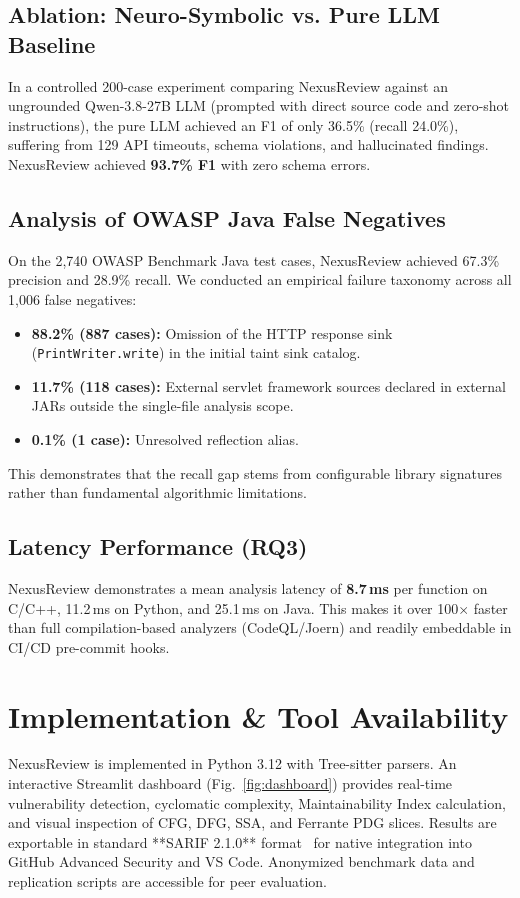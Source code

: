 \documentclass[10pt,conference]{IEEEtran}
\begin{document}
\subsection{Ablation: Neuro-Symbolic vs. Pure LLM Baseline}
In a controlled 200-case experiment comparing NexusReview against an ungrounded Qwen-3.8-27B LLM (prompted with direct source code and zero-shot instructions), the pure LLM achieved an F1 of only 36.5\% (recall 24.0\%), suffering from 129 API timeouts, schema violations, and hallucinated findings. NexusReview achieved \textbf{93.7\% F1} with zero schema errors.

\subsection{Analysis of OWASP Java False Negatives}
On the 2{,}740 OWASP Benchmark Java test cases, NexusReview achieved 67.3\% precision and 28.9\% recall. We conducted an empirical failure taxonomy across all 1{,}006 false negatives:
\begin{itemize}
    \item \textbf{88.2\% (887 cases):} Omission of the HTTP response sink (\texttt{PrintWriter.write}) in the initial taint sink catalog.
    \item \textbf{11.7\% (118 cases):} External servlet framework sources declared in external JARs outside the single-file analysis scope.
    \item \textbf{0.1\% (1 case):} Unresolved reflection alias.
\end{itemize}
This demonstrates that the recall gap stems from configurable library signatures rather than fundamental algorithmic limitations.

\subsection{Latency Performance (RQ3)}
NexusReview demonstrates a mean analysis latency of \textbf{8.7\,ms} per function on C/C++, 11.2\,ms on Python, and 25.1\,ms on Java. This makes it over 100$\times$ faster than full compilation-based analyzers (CodeQL/Joern) and readily embeddable in CI/CD pre-commit hooks.

\section{Implementation \& Tool Availability}

NexusReview is implemented in Python 3.12 with Tree-sitter parsers. An interactive Streamlit dashboard (Fig.~\ref{fig:dashboard}) provides real-time vulnerability detection, cyclomatic complexity, Maintainability Index calculation, and visual inspection of CFG, DFG, SSA, and Ferrante PDG slices. Results are exportable in standard **SARIF 2.1.0** format~\cite{sarif} for native integration into GitHub Advanced Security and VS Code. Anonymized benchmark data and replication scripts are accessible for peer evaluation.
\end{document}
